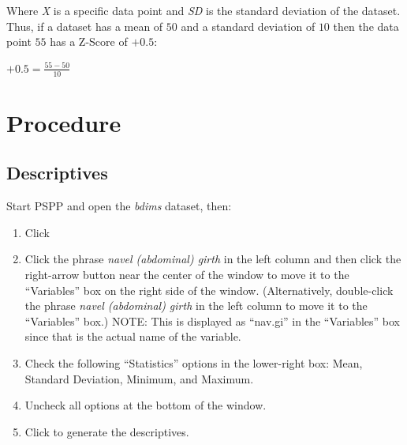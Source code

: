 Where \textit{X} is a specific data point and \textit{SD} is the standard deviation of the dataset. Thus, if a dataset has a mean of $ 50 $ and a standard deviation of $ 10 $ then the data point $ 55 $ has a Z-Score of $ +0.5 $:

\begin{center}
  $ +0.5 = \frac{55 - 50}{10} $
\end{center}

\section{Procedure}

\subsection{Descriptives}

Start \acs{PSPP} and open the \textit{bdims} dataset, then:

\begin{enumerate}
  \item Click \textsc{}
  \item Click the phrase \textit{navel (abdominal) girth} in the left column and then click the right-arrow button near the center of the window to move it to the ``Variables'' box on the right side of the window. (Alternatively, double-click the phrase \textit{navel (abdominal) girth} in the left column to move it to the ``Variables'' box.) NOTE: This is displayed as ``nav.gi'' in the ``Variables'' box since that is the actual name of the variable.
  \item Check the following ``Statistics'' options in the lower-right box: Mean, Standard Deviation, Minimum, and Maximum.
  \item Uncheck all options at the bottom of the window.
  \item Click  to generate the descriptives.
\end{enumerate}

